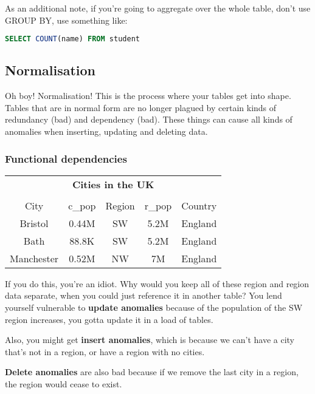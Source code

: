 \documentclass[11pt,a4paper,titlepage,dvipsnames,cmyk]{scrartcl}
\begin{document}
As an additional note, if you're going to aggregate over the whole table,
don't use GROUP BY, use something like:

\begin{lstlisting}[language=SQL]
SELECT COUNT(name) FROM student
\end{lstlisting}

\subsection{Normalisation}%
\label{sub:Normalisation}
Oh boy! Normalisation! This is the process where your tables get into
shape. Tables that are in normal form are no longer plagued by certain
kinds of redundancy (bad) and dependency (bad). These things can cause all
kinds of anomalies when inserting, updating and deleting data.

\subsubsection{Functional dependencies}%
\label{ssub:functional-dependencies}

\begin{center}
    \begin{tabular}{c c c c c}
        \multicolumn{5}{c}{\textbf{Cities in the UK}} \\
        \multicolumn{5}{c}{} \\ \hline
        City & c\_pop & Region & r\_pop & Country \\ \hhline{=====}
        Bristol & 0.44M & SW & 5.2M & England \\ 
        Bath & 88.8K & SW & 5.2M & England \\ 
        Manchester & 0.52M & NW & 7M & England \\ \hline
    \end{tabular}
\end{center}

If you do this, you're an idiot. Why would you keep all of these region
and region data separate, when you could just reference it in another
table? You lend yourself vulnerable to \textbf{update anomalies} because
of the population of the SW region increases, you gotta update it in a
load of tables.

Also, you might get \textbf{insert anomalies}, which is because we can't
have a city that's not in a region, or have a region with no cities.

\textbf{Delete anomalies} are also bad because if we remove the last city
in a region, the region would cease to exist.
\end{document}
